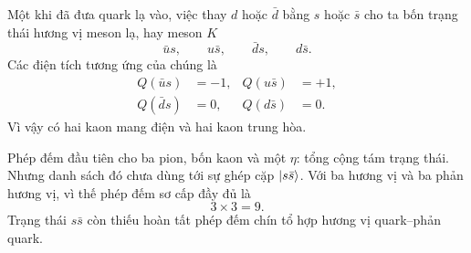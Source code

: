 Một khi đã đưa quark lạ vào, việc thay \(d\) hoặc \(\bar d\) bằng \(s\) hoặc \(\bar s\) cho ta bốn trạng thái hương vị meson lạ, hay meson \(K\)
\begin{equation}
\bar u s,\qquad u\bar s,\qquad \bar d s,\qquad d\bar s.
\end{equation}
Các điện tích tương ứng của chúng là
\begin{align}
Q(\bar u s) &=-1,
&
Q(u\bar s) &=+1,
\\
Q(\bar d s) &=0,
&
Q(d\bar s) &=0.
\end{align}
Vì vậy có hai kaon mang điện và hai kaon trung hòa.

Phép đếm đầu tiên cho ba pion, bốn kaon và một \(\eta\): tổng cộng tám trạng thái. Nhưng danh sách đó chưa dùng tới sự ghép cặp \(\left\lvert s\bar s\right\rangle\). Với ba hương vị và ba phản hương vị, vì thế phép đếm sơ cấp đầy đủ là
\begin{equation}
3\times3=9.
\end{equation}
Trạng thái \(s\bar s\) còn thiếu hoàn tất phép đếm chín tổ hợp hương vị quark--phản quark.
